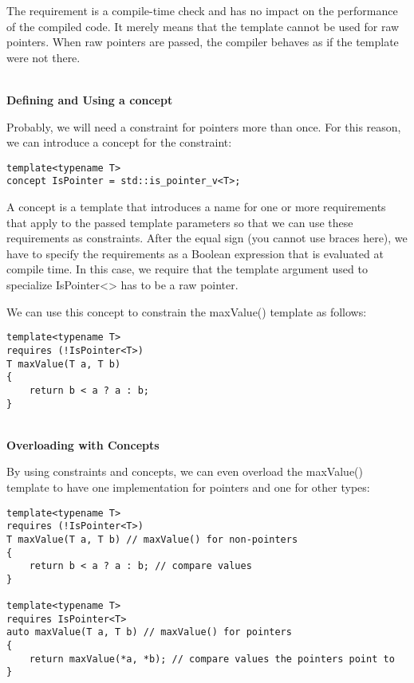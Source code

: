 The requirement is a compile-time check and has no impact on the performance of the compiled code. It merely means that the template cannot be used for raw pointers. When raw pointers are passed, the compiler behaves as if the template were not there.

\noindent
\hspace*{\fill} \\ %
\textbf{Defining and Using a concept}

Probably, we will need a constraint for pointers more than once. For this reason, we can introduce a concept for the constraint:

\begin{lstlisting}[style=styleCXX]
template<typename T>
concept IsPointer = std::is_pointer_v<T>;
\end{lstlisting}

A concept is a template that introduces a name for one or more requirements that apply to the passed template parameters so that we can use these requirements as constraints. After the equal sign (you cannot use braces here), we have to specify the requirements as a Boolean expression that is evaluated at compile time. In this case, we require that the template argument used to specialize IsPointer<> has to be a raw pointer.

We can use this concept to constrain the maxValue() template as follows:

\begin{lstlisting}[style=styleCXX]
template<typename T>
requires (!IsPointer<T>)
T maxValue(T a, T b)
{
	return b < a ? a : b;
}
\end{lstlisting}

\noindent
\hspace*{\fill} \\ %
\textbf{Overloading with Concepts}

By using constraints and concepts, we can even overload the maxValue() template to have one implementation for pointers and one for other types:

\begin{lstlisting}[style=styleCXX]
template<typename T>
requires (!IsPointer<T>)
T maxValue(T a, T b) // maxValue() for non-pointers
{
	return b < a ? a : b; // compare values
}

template<typename T>
requires IsPointer<T>
auto maxValue(T a, T b) // maxValue() for pointers
{
	return maxValue(*a, *b); // compare values the pointers point to
}
\end{lstlisting}

